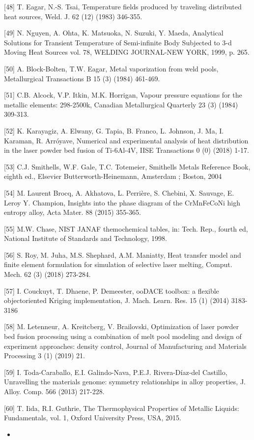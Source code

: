 \documentclass[10pt]{article}
\begin{document}
[48] T. Eagar, N.-S. Tsai, Temperature fields produced by traveling distributed heat sources, Weld. J. 62 (12) (1983) 346-355.

[49] N. Nguyen, A. Ohta, K. Matsuoka, N. Suzuki, Y. Maeda, Analytical Solutions for Transient Temperature of Semi-infinite Body Subjected to 3-d Moving Heat Sources vol. 78, WELDING JOURNAL-NEW YORK, 1999, p. 265.

[50] A. Block-Bolten, T.W. Eagar, Metal vaporization from weld pools, Metallurgical Transactions B 15 (3) (1984) 461-469.

[51] C.B. Alcock, V.P. Itkin, M.K. Horrigan, Vapour pressure equations for the metallic elements: 298-2500k, Canadian Metallurgical Quarterly 23 (3) (1984) 309-313.

[52] K. Karayagiz, A. Elwany, G. Tapia, B. Franco, L. Johnson, J. Ma, I. Karaman, R. Arróyave, Numerical and experimental analysis of heat distribution in the laser powder bed fusion of Ti-6Al-4V, IISE Transactions 0 (0) (2018) 1-17.

[53] C.J. Smithells, W.F. Gale, T.C. Totemeier, Smithells Metals Reference Book, eighth ed., Elsevier Butterworth-Heinemann, Amsterdam ; Boston, 2004

[54] M. Laurent Brocq, A. Akhatova, L. Perrière, S. Chebini, X. Sauvage, E. Leroy Y. Champion, Insights into the phase diagram of the CrMnFeCoNi high entropy alloy, Acta Mater. 88 (2015) 355-365.

[55] M.W. Chase, NIST JANAF themochemical tables, in: Tech. Rep., fourth ed, National Institute of Standards and Technology, 1998.

[56] S. Roy, M. Juha, M.S. Shephard, A.M. Maniatty, Heat transfer model and finite element formulation for simulation of selective laser melting, Comput. Mech. 62 (3) (2018) 273-284.

[57] I. Couckuyt, T. Dhaene, P. Demeester, ooDACE toolbox: a flexible objectoriented Kriging implementation, J. Mach. Learn. Res. 15 (1) (2014) 3183-3186

[58] M. Letenneur, A. Kreitcberg, V. Brailovski, Optimization of laser powder bed fusion processing using a combination of melt pool modeling and design of experiment approaches: density control, Journal of Manufacturing and Materials Processing 3 (1) (2019) 21.

[59] I. Toda-Caraballo, E.I. Galindo-Nava, P.E.J. Rivera-Díaz-del Castillo, Unravelling the materials genome: symmetry relationships in alloy properties, J. Alloy. Comp. 566 (2013) 217-228.

[60] T. Iida, R.I. Guthrie, The Thermophysical Properties of Metallic Liquids: Fundamentals, vol. 1, Oxford University Press, USA, 2015.

\begin{itemize}
  \item 
\end{itemize}
\end{document}

